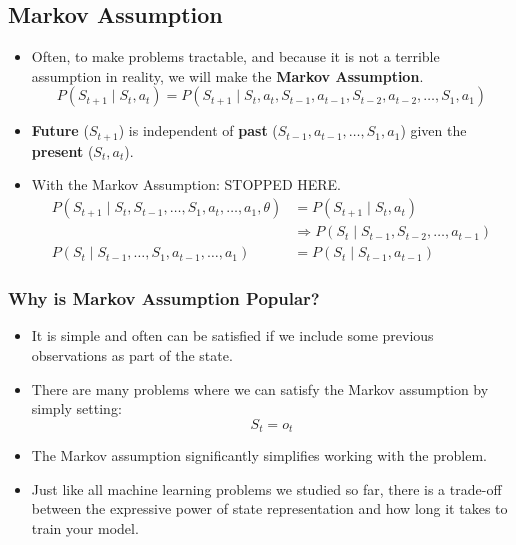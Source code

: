 \subsection{Markov Assumption}
\begin{definition}
    \begin{itemize}
        \item Often, to make problems tractable, and because it is not a terrible assumption in reality, we will make the \textbf{Markov Assumption}.
        \[
        P(S_{t+1} \mid S_t, a_t) = P(S_{t+1} \mid S_t, a_t, S_{t-1}, a_{t-1}, S_{t-2}, a_{t-2}, \ldots, S_1, a_1)
        \]
    
        \item \textbf{Future} (\( S_{t+1} \)) is independent of \textbf{past} (\( S_{t-1}, a_{t-1}, \ldots, S_1, a_1 \)) given the \textbf{present} (\( S_t, a_t \)).
        
        \item With the Markov Assumption: STOPPED HERE.
        \begin{align*}
            P(S_{t+1} \mid S_t, S_{t-1}, \ldots, S_1, a_t, \ldots, a_1, \theta) &= P(S_{t+1} \mid S_t, a_t) \\
            &\Rightarrow P(S_t \mid S_{t-1}, S_{t-2}, \ldots, a_{t-1}) \\
            P(S_t \mid S_{t-1}, \ldots, S_1, a_{t-1}, \ldots, a_1) &= P(S_t \mid S_{t-1}, a_{t-1})
        \end{align*}
    \end{itemize}
\end{definition}

\subsubsection{Why is Markov Assumption Popular?}
\begin{definition}
    \begin{itemize}
        \item It is simple and often can be satisfied if we include some previous observations as part of the state.
        
        \item There are many problems where we can satisfy the Markov assumption by simply setting:
        \[
        S_t = o_t
        \]
    
        \item The Markov assumption significantly simplifies working with the problem.
        
        \item Just like all machine learning problems we studied so far, there is a trade-off between the expressive power of state representation and how long it takes to train your model.
    \end{itemize}    
\end{definition}

